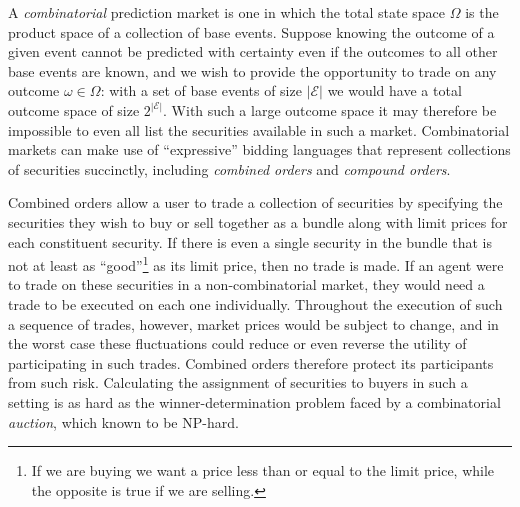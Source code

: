 A \emph{combinatorial} prediction market is one in which the total state space
$\Omega$ is the product space of a collection of base events. Suppose knowing
the outcome of a given event cannot be predicted with certainty even if the
outcomes to all other base events are known, and we wish to provide the
opportunity to trade on any outcome $\omega \in \Omega$: with a set of base
events of size $\mathcal{|E|}$ we would have a total outcome space of size
$2^\mathcal{|E|}$.  With such a large outcome space it may therefore be
impossible to even all list the securities available in such a market.
Combinatorial markets can make use of ``expressive'' bidding languages that
represent collections of securities succinctly, including \emph{combined
orders} and \emph{compound orders}.

Combined orders allow a user to trade a collection of securities by specifying
the securities they wish to buy or sell together as a bundle along with limit
prices for each constituent security. If there is even a single security in the
bundle that is not at least as ``good''\footnote{If we are buying we want a
price less than or equal to the limit price, while the opposite is true if we
are selling.} as its limit price, then no trade is made. If an agent were to
trade on these securities in a non-combinatorial market, they would need a
trade to be executed on each one individually. Throughout the execution of such
a sequence of trades, however, market prices would be subject to change, and in
the worst case these fluctuations could reduce or even reverse the utility of
participating in such trades. Combined orders therefore protect its
participants from such risk. Calculating the assignment of securities to buyers
in such a setting is as hard as the winner-determination problem faced by a
combinatorial \emph{auction}, which known to be NP-hard.

